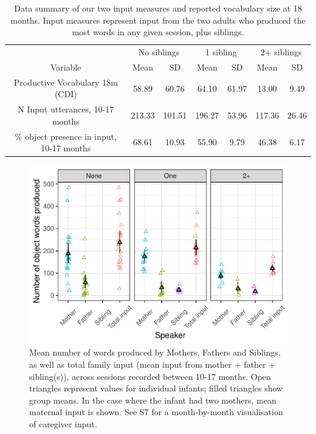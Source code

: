 \documentclass[
  man,floatsintext]{apa6}
\begin{document}
\begin{table}[!h]

\caption{\label{tab:table-data-summary}Data summary of our two input measures and reported vocabulary size at 18 months. Input measures represent input from the two adults who produced the most words in any given session, plus siblings.}
\centering
\begin{tabular}[t]{ccccccc}
\toprule
\multicolumn{1}{c}{ } & \multicolumn{2}{c}{No siblings} & \multicolumn{2}{c}{1 sibling} & \multicolumn{2}{c}{2+ siblings} \\
\cmidrule(l{3pt}r{3pt}){2-3} \cmidrule(l{3pt}r{3pt}){4-5} \cmidrule(l{3pt}r{3pt}){6-7}
\multicolumn{1}{c}{Variable} & \multicolumn{1}{c}{Mean} & \multicolumn{1}{c}{SD} & \multicolumn{1}{c}{Mean} & \multicolumn{1}{c}{SD} & \multicolumn{1}{c}{Mean} & \multicolumn{1}{c}{SD} \\
\cmidrule(l{3pt}r{3pt}){1-1} \cmidrule(l{3pt}r{3pt}){2-2} \cmidrule(l{3pt}r{3pt}){3-3} \cmidrule(l{3pt}r{3pt}){4-4} \cmidrule(l{3pt}r{3pt}){5-5} \cmidrule(l{3pt}r{3pt}){6-6} \cmidrule(l{3pt}r{3pt}){7-7}
Productive Vocabulary 18m (CDI) & 58.89 & 60.76 & 64.10 & 61.97 & 13.00 & 9.49\\
N Input utterances, 10-17 months & 213.33 & 101.51 & 196.27 & 53.96 & 117.36 & 26.46\\
\% object presence in input, 10-17 months & 68.61 & 10.93 & 55.90 & 9.79 & 46.38 & 6.17\\
\bottomrule
\end{tabular}
\end{table}

\begin{figure}
\centering
\includegraphics{SiblingsStudyText-final_files/figure-latex/Figure-Speaker-count-1.pdf}
\caption{\label{fig:Figure-Speaker-count}Mean number of words produced by Mothers, Fathers and Siblings, as well as total family input (mean input from mother + father + sibling(s)), across sessions recorded between 10-17 months. Open triangles represent values for individual infants; filled triangles show group means. In the case where the infant had two mothers, mean maternal input is shown. See S7 for a month-by-month visualisation of caregiver input.}
\end{figure}
\end{document}
